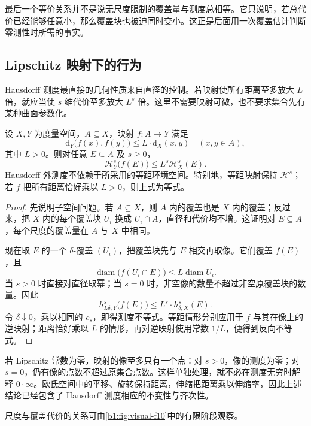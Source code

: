 最后一个等价关系并不是说无尺度限制的覆盖量与测度总相等。它只说明，若总代价已经能够任意小，那么覆盖块也被迫同时变小。这正是后面用一次覆盖估计判断零测性时所需的事实。

\subsection{Lipschitz 映射下的行为}
\label{b1:subsec:150104}

Hausdorff 测度最直接的几何性质来自直径的控制。若映射使所有距离至多放大 \(L\) 倍，就应当使 \(s\) 维代价至多放大 \(L^s\) 倍。这里不需要映射可微，也不要求集合先有某种曲面参数化。

\begin{proposition}
\label{b1:prop:hausdorff-lipschitz}
设 \(X,Y\) 为度量空间，\(A\subseteq X\)，映射 \(f:A\to Y\) 满足
\[
\mathrm{d}_Y\bigl(f(x),f(y)\bigr)\leq L\cdot \mathrm{d}_X(x,y)
\quad(x,y\in A),
\]
其中 \(L>0\)。则对任意 \(E\subseteq A\) 及 \(s\geq0\)，
\[
\mathcal H^s_Y\bigl(f(E)\bigr)\leq L^s\mathcal H^s_X(E).
\]
Hausdorff 外测度不依赖于所采用的等距环境空间。特别地，等距映射保持 \(\mathcal H^s\)；若 \(f\) 把所有距离恰好乘以 \(L>0\)，则上式为等式。
\end{proposition}
\begin{proof}
先说明子空间问题。若 \(A\subseteq X\)，则 \(A\) 内的覆盖也是 \(X\) 内的覆盖；反过来，把 \(X\) 内的每个覆盖块 \(U_i\) 换成 \(U_i\cap A\)，直径和代价均不增。这证明对 \(E\subseteq A\)，每个尺度的覆盖量在 \(A\) 与 \(X\) 中相同。

现在取 \(E\) 的一个 \(\delta\)-覆盖 \((U_i)\)，把覆盖块先与 \(E\) 相交再取像。它们覆盖 \(f(E)\)，且
\[
\operatorname{diam}\bigl(f(U_i\cap E)\bigr)
\leq L\operatorname{diam}U_i.
\]
当 \(s>0\) 时直接对直径取幂；当 \(s=0\) 时，非空像的数量不超过非空原覆盖块的数量。因此
\[
h^s_{L\delta,Y}\bigl(f(E)\bigr)\leq L^s \cdot h^s_{\delta,X}(E).
\]
令 \(\delta\downarrow0\)，乘以相同的 \(c_s\)，即得测度不等式。等距情形分别应用于 \(f\) 与其在像上的逆映射；距离恰好乘以 \(L\) 的情形，再对逆映射使用常数 \(1/L\)，便得到反向不等式。
\end{proof}

若 Lipschitz 常数为零，映射的像至多只有一个点：对 \(s>0\)，像的测度为零；对 \(s=0\)，仍有像的点数不超过原集合点数。这样单独处理，就不必在测度无穷时解释 \(0\cdot\infty\)。欧氏空间中的平移、旋转保持距离，伸缩把距离乘以伸缩率，因此上述结论已经包含了 Hausdorff 测度相应的不变性与齐次性。

尺度与覆盖代价的关系可由\cref{b1:fig:visual-f10}中的有限阶段观察。

